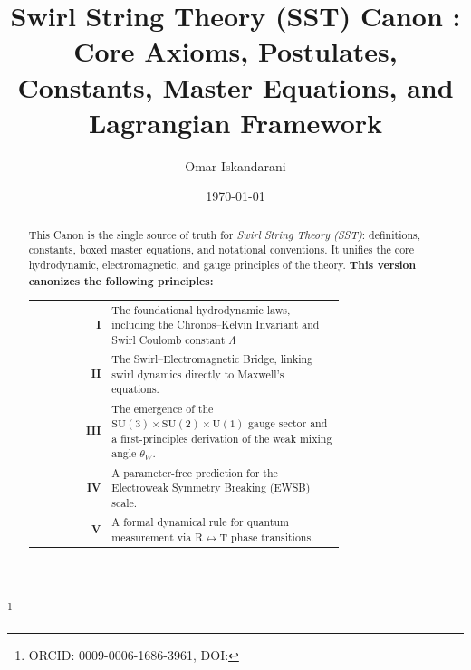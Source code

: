 \documentclass[10pt,reprint,aps,onecolumn,nofootinbib]{revtex4-2}
\newcommand{\Lam}{\Lambda}                               %
\begin{document}
    \title{Swirl String Theory (SST) Canon \canonversion: \\ Core Axioms, Postulates, Constants, Master Equations, and Lagrangian Framework}
    \author{Omar Iskandarani}
    \thanks{ORCID: 0009-0006-1686-3961, DOI: \paperdoi}
    \date{\today}

    \begin{abstract}
        This Canon is the single source of truth for \emph{Swirl String Theory (SST)}: definitions, constants, boxed master equations, and notational conventions. It unifies the core hydrodynamic, electromagnetic, and gauge principles of the theory.
        \textbf{This version canonizes the following principles:}

        \begin{tabular}{r@{\quad}p{0.75\linewidth}}
            \textbf{I} & The foundational hydrodynamic laws, including the Chronos–Kelvin Invariant and Swirl Coulomb constant $\Lam$ \\
            \textbf{II} & The Swirl–Electromagnetic Bridge, linking swirl dynamics directly to Maxwell's equations.\\
            \textbf{III} & The emergence of the $\mathrm{SU}(3)\times\mathrm{SU}(2)\times\mathrm{U}(1)$ gauge sector and a first-principles derivation of the weak mixing angle $\theta_W$.\\
            \textbf{IV} & A parameter-free prediction for the Electroweak Symmetry Breaking (EWSB) scale. \\
            \textbf{V} & A formal dynamical rule for quantum measurement via R$\leftrightarrow$T phase transitions. \\
        \end{tabular}



\end{abstract}
\end{document}
